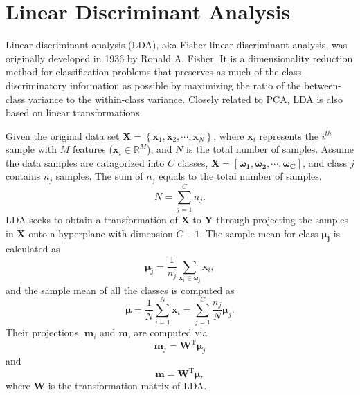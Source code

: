 \section{Linear Discriminant Analysis\label{Sec:DR:LDA}}
Linear discriminant analysis (LDA), aka Fisher linear discriminant analysis, was originally developed in 1936 by Ronald A. Fisher\cite{FisherAE1936}. It is a dimensionality reduction method for classification problems that preserves as much of the class discriminatory information as possible by maximizing the ratio of the between-class variance to the within-class variance. Closely related to PCA, LDA is also based on linear transformations.

Given the original data set $\mathbf{X}=\left\{\mathbf{x}_1, \mathbf{x}_2,\cdots,\mathbf{x}_N\right\}$, where $\mathbf{x}_i$ represents the $i^{th}$ sample with $M$ features ($\mathbf{x}_i\in \mathbb{R}^M$), and $N$ is the total number of samples. Assume the data samples are catagorized into $C$ classes, $\mathbf{X}=\left[\boldsymbol{\omega_1}, \boldsymbol{\omega_2}, \cdots, \boldsymbol{\omega_C}\right]$, and class $j$ contains $n_j$ samples. The sum of $n_j$ equals to the  total number of samples.
\begin{equation}
	N=\sum_{j=1}^C n_j.
\end{equation}
LDA seeks to obtain a transformation of $\mathbf{X}$ to $\mathbf{Y}$ through projecting the samples in $\mathbf{X}$ onto a hyperplane with dimension $C-1$. The sample mean for class $\boldsymbol{\mu_j}$ is calculated as
\begin{equation}
    \boldsymbol{\mu_j}=\frac{1}{n_j}\sum_{\mathbf{x}_i\in \boldsymbol{\omega_j}} \mathbf{x}_i,
\end{equation} 
and the sample mean of all the classes is computed as
\begin{equation}
    \boldsymbol{\mu}=\frac{1}{N}\sum_{i=1}^{N} \mathbf{x}_i=\sum_{j=1}^C \frac{n_j}{N}\boldsymbol{\mu}_j.
\end{equation}
Their projections, $\mathbf{m}_i$ and $\mathbf{m}$, are computed via
\begin{equation}
    \mathbf{m}_j=\mathbf{W}^{\operatorname{T}}\boldsymbol{\mu}_j
\end{equation}
and
\begin{equation}
	\mathbf{m}=\mathbf{W}^{\operatorname{T}}\boldsymbol{\mu},
\end{equation}
where $\mathbf{W}$ is the transformation matrix of LDA.

